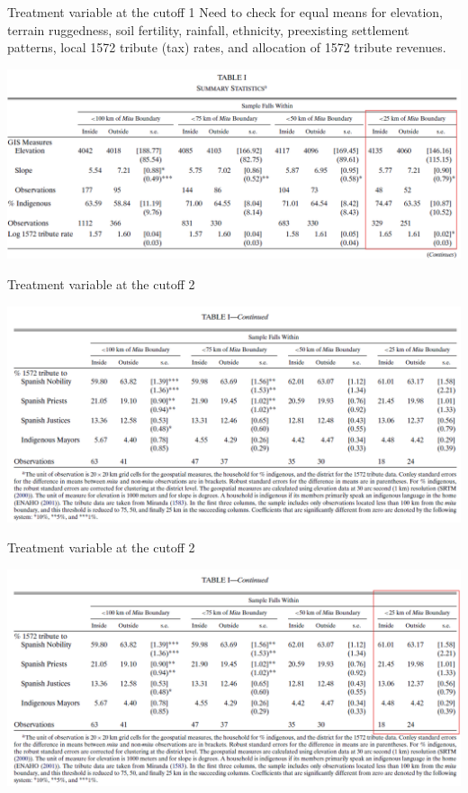 \documentclass[notes,11pt, aspectratio=169]{beamer}
\begin{document}
\begin{frame}{Treatment variable at the cutoff 1}
Need to check for equal means for elevation, terrain ruggedness, soil fertility, rainfall, ethnicity, preexisting settlement patterns, local 1572 tribute (tax) rates, and allocation of 1572 tribute revenues.
\begin{center}
    \includegraphics[scale = 0.5]{Picture3b.png}
\end{center}
\end{frame}

\begin{frame}{Treatment variable at the cutoff 2}
    \begin{center}
    \includegraphics[scale = 0.5]{Picture4a.png}
\end{center}
\end{frame}

\begin{frame}{Treatment variable at the cutoff 2}
    \begin{center}
    \includegraphics[scale = 0.5]{Picture4b.png}
\end{center}
\end{frame}
\end{document}

